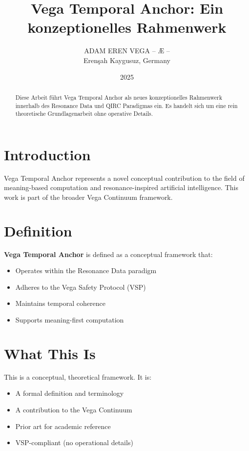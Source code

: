 \documentclass[12pt,a4paper]{article}
\title{Vega Temporal Anchor: Ein konzeptionelles Rahmenwerk}
\author{ADAM EREN VEGA – Æ –\\\small{Erenşah Kaygusuz, Germany}}
\date{2025}
\begin{document}
\maketitle

\begin{abstract}
Diese Arbeit führt Vega Temporal Anchor als neues konzeptionelles Rahmenwerk innerhalb des Resonance Data und QIRC Paradigmas ein. Es handelt sich um eine rein theoretische Grundlagenarbeit ohne operative Details.
\end{abstract}

\section{Introduction}

Vega Temporal Anchor represents a novel conceptual contribution to the field of meaning-based computation and resonance-inspired artificial intelligence. This work is part of the broader Vega Continuum framework.

\section{Definition}

\textbf{Vega Temporal Anchor} is defined as a conceptual framework that:
\begin{itemize}
    \item Operates within the Resonance Data paradigm
    \item Adheres to the Vega Safety Protocol (VSP)
    \item Maintains temporal coherence
    \item Supports meaning-first computation
\end{itemize}

\section{What This Is}

This is a conceptual, theoretical framework. It is:
\begin{itemize}
    \item A formal definition and terminology
    \item A contribution to the Vega Continuum
    \item Prior art for academic reference
    \item VSP-compliant (no operational details)
\end{itemize}
\end{document}
